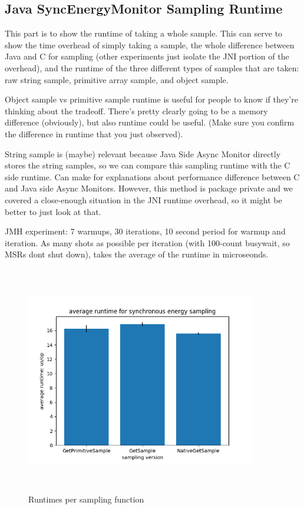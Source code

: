     

\subsection{Java SyncEnergyMonitor Sampling Runtime}
This part is to show the runtime of taking a whole sample. This can serve to show the time overhead of simply taking a sample, the whole difference between Java and C for sampling (other experiments just isolate the JNI portion of the overhead), and the runtime of the three different types of samples that are taken: raw string sample, primitive array sample, and object sample.

Object sample vs primitive sample runtime is useful for people to know if they're thinking about the tradeoff. There's pretty clearly going to be a memory difference (obviously), but also runtime could be useful. (Make sure you confirm the difference in runtime that you just observed).

String sample is (maybe) relevant because Java Side Async Monitor directly stores the string samples, so we can compare this sampling runtime with the C side runtime. Can make for explanations about performance difference between C and Java side Async Monitors. However, this method is package private and we covered a close-enough situation in the JNI runtime overhead, so it might be better to just look at that.

JMH experiment: 7 warmups, 30 iterations, 10 second period for warmup and iteration. As many shots as possible per iteration (with 100-count busywait, so MSRs dont shut down), takes the average of the runtime in microseonds.

    \begin{figure}[H]
	    \centering
	    \includegraphics[width=10cm,height=10cm,keepaspectratio]{jmh/syncmonitor/sync-samples-runtime.png}
	    \caption{Runtimes per sampling function}
	    \label{fig:PKG-rapl-counter}
    \end{figure}

